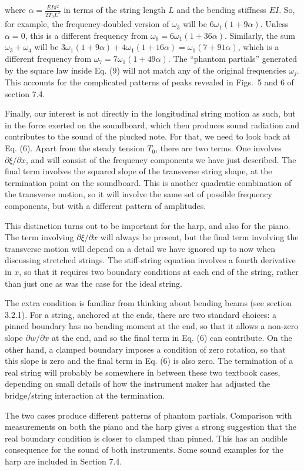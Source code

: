   \noindent{}where $\alpha=\frac{EI\pi^2}{2T_0 L^2}$ in terms of the string 
  length $L$ and the bending stiffness $EI$. So, for example, the 
  frequency-doubled version of $\omega_3$ will be $6 \omega_1 (1+9 \alpha)$. 
  Unless $\alpha = 0$, this is a different frequency from $\omega_6 = 6 
  \omega_1 (1+36 \alpha)$. Similarly, the sum $\omega_3 + \omega_4$ will be $3 
  \omega_1 (1+9 \alpha) + 4 \omega_1(1+16 \alpha) = \omega_1 (7 + 91 \alpha)$, 
  which is a different frequency from $\omega_7 = 7 \omega_1 (1+49 \alpha)$. 
  The ``phantom partials'' generated by the square law inside Eq. (9) will not 
  match any of the original frequencies $\omega_j$. This accounts for the 
  complicated patterns of peaks revealed in Figs.\ 5 and 6 of section 7.4. 

  Finally, our interest is not directly in the longitudinal string motion as 
  such, but in the force exerted on the soundboard, which then produces sound 
  radiation and contributes to the sound of the plucked note. For that, we need 
  to look back at Eq. (6). Apart from the steady tension $T_0$, there are two 
  terms. One involves $\partial \xi/\partial x$, and will consist of the 
  frequency components we have just described. The final term involves the 
  squared slope of the transverse string shape, at the termination point on the 
  soundboard. This is another quadratic combination of the transverse motion, 
  so it will involve the same set of possible frequency components, but with a 
  different pattern of amplitudes. 

  This distinction turns out to be important for the harp, and also for the 
  piano. The term involving $\partial \xi/\partial x$ will always be present, 
  but the final term involving the transverse motion will depend on a detail we 
  have ignored up to now when discussing stretched strings. The stiff-string 
  equation involves a fourth derivative in $x$, so that it requires two 
  boundary conditions at each end of the string, rather than just one as was 
  the case for the ideal string. 

  The extra condition is familiar from thinking about bending beams (see 
  section 3.2.1). For a string, anchored at the ends, there are two standard 
  choices: a pinned boundary has no bending moment at the end, so that it 
  allows a non-zero slope $\partial w/\partial x$ at the end, and so the final 
  term in Eq. (6) can contribute. On the other hand, a clamped boundary imposes 
  a condition of zero rotation, so that this slope is zero and the final term 
  in Eq. (6) is also zero. The termination of a real string will probably be 
  somewhere in between these two textbook cases, depending on small details of 
  how the instrument maker has adjusted the bridge/string interaction at the 
  termination. 

  The two cases produce different patterns of phantom partials. Comparison with 
  measurements on both the piano and the harp gives a strong suggestion that 
  the real boundary condition is closer to clamped than pinned. This has an 
  audible consequence for the sound of both instruments. Some sound examples 
  for the harp are included in Section 7.4. 